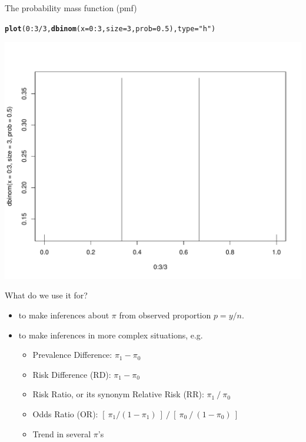 \documentclass[handout]{beamer}\usepackage[]{graphicx}\usepackage[]{color}
\newcommand{\hlnum}[1]{\textcolor[rgb]{0.686,0.059,0.569}{#1}}%
\newcommand{\hlstr}[1]{\textcolor[rgb]{0.192,0.494,0.8}{#1}}%
\newcommand{\hlopt}[1]{\textcolor[rgb]{0,0,0}{#1}}%
\newcommand{\hlstd}[1]{\textcolor[rgb]{0.345,0.345,0.345}{#1}}%
\newcommand{\hlkwc}[1]{\textcolor[rgb]{0.333,0.667,0.333}{#1}}%
\newcommand{\hlkwd}[1]{\textcolor[rgb]{0.737,0.353,0.396}{\textbf{#1}}}%
\newenvironment{knitrout}{}{} %
\begin{document}
\begin{frame}[fragile]{The probability mass function (pmf)}

\begin{knitrout}\scriptsize
{}\color{fgcolor}
\begin{alltt}
\hlkwd{plot}\hlstd{(}\hlnum{0}\hlopt{:}\hlnum{3}\hlopt{/}\hlnum{3}\hlstd{,} \hlkwd{dbinom}\hlstd{(}\hlkwc{x} \hlstd{=} \hlnum{0}\hlopt{:}\hlnum{3}\hlstd{,} \hlkwc{size} \hlstd{=} \hlnum{3}\hlstd{,} \hlkwc{prob} \hlstd{=} \hlnum{0.5}\hlstd{),} \hlkwc{type} \hlstd{=} \hlstr{"h"}\hlstd{)}
\end{alltt}


{\centering \includegraphics[width=1\linewidth]{figure/unnamed-chunk-2-1} 

}



\end{knitrout}
\end{frame}

\begin{frame}[fragile]{What do we use it for?}
\small
\begin{itemize}
	\setlength\itemsep{0.7em}
	\item to make inferences about $\pi$ from  observed  proportion $p= y/n.$ \pause 
	\item to make inferences in more complex situations, e.g. 
	\begin{itemize}
			\setlength\itemsep{0.4em}
		\item Prevalence Difference: $\pi _{1} - \pi _{0}$
		\item Risk Difference (RD): $\pi _{1} - \pi _{0}$
		\item Risk Ratio, or its synonym Relative Risk (RR): $\pi _{1}\:/\:\pi _{0}$
		\item Odds Ratio (OR): $[\: \pi _{1}/(1-\pi _{1})\:] \: / \: [\: \pi _{0}\: / \: (1-\pi _{0}) \: ]$
		\item Trend in several $\pi $'s
	\end{itemize}
\end{itemize}
\end{frame}
\end{document}
